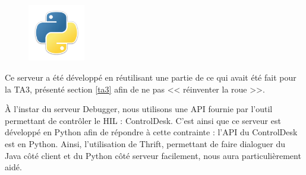 \begin{figure}
	\includegraphics[width=2.5cm]{contents/images/python.png}
\end{figure}
Ce serveur a été développé en réutilisant une partie de ce qui avait été fait pour la TA3, présenté section \ref{ta3} afin de ne pas
<< réinventer la roue >>. 

À l'instar du serveur Debugger, nous utilisons une API fournie par l'outil permettant de contrôler le HIL : ControlDesk. 
C'est ainsi que ce serveur est développé en Python afin de répondre à cette contrainte : l'API du ControlDesk est en Python. Ainsi, l'utilisation de Thrift, permettant de faire dialoguer du Java côté client et du Python côté serveur facilement, nous aura particulièrement aidé.


